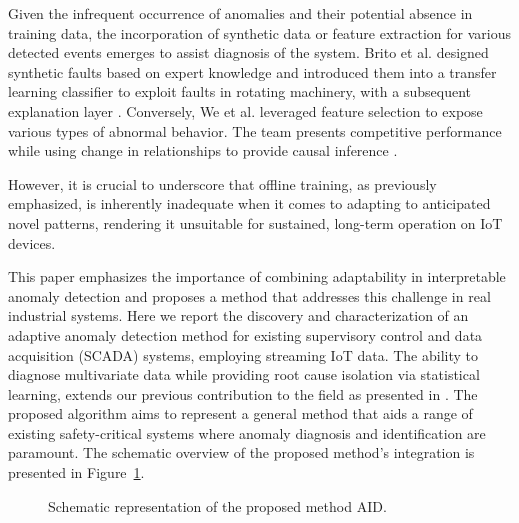 Given the infrequent occurrence of anomalies and their potential absence in training data, the incorporation of synthetic data or feature extraction for various detected events emerges to assist diagnosis of the system. Brito et al. designed synthetic faults based on expert knowledge and introduced them into a transfer learning classifier to exploit faults in rotating machinery, with a subsequent explanation layer \citep{BRITO2023120860}. Conversely, We et al. leveraged feature selection to expose various types of abnormal behavior. The team presents competitive performance while using change in relationships to provide causal inference \citep{WU2024121539}.

However, it is crucial to underscore that offline training, as previously emphasized, is inherently inadequate when it comes to adapting to anticipated novel patterns, rendering it unsuitable for sustained, long-term operation on IoT devices.

This paper emphasizes the importance of combining adaptability in interpretable anomaly detection and proposes a method that addresses this challenge in real industrial systems. Here we report the discovery and characterization of an adaptive anomaly detection method for existing supervisory control and data acquisition (SCADA) systems, employing streaming IoT data. The ability to diagnose multivariate data while providing root cause isolation via statistical learning, extends our previous contribution to the field as presented in \citep{Wadinger2023}. The proposed algorithm aims to represent a general method that aids a range of existing safety-critical systems where anomaly diagnosis and identification are paramount. The schematic overview of the proposed method's integration is presented in Figure~\ref{fig:overview}.

\begin{figure}[htbp]
    \centering
    \caption{Schematic representation of the proposed method AID.}
    \label{fig:overview}
\end{figure}

